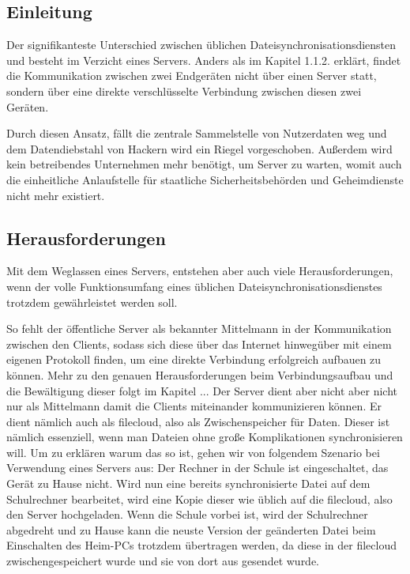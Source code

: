 \subsection{Einleitung}
Der signifikanteste Unterschied zwischen üblichen Dateisynchronisationsdiensten
und \sblit besteht im Verzicht eines Servers. Anders als im Kapitel 1.1.2. erklärt,
findet die Kommunikation zwischen zwei Endgeräten nicht über einen Server statt,
sondern über eine direkte verschlüsselte Verbindung zwischen diesen zwei Geräten.

Durch diesen Ansatz, fällt die zentrale Sammelstelle von Nutzerdaten
weg und dem Datendiebstahl von Hackern wird ein Riegel vorgeschoben. Außerdem
wird kein betreibendes Unternehmen mehr benötigt, um Server zu warten, womit auch
die einheitliche Anlaufstelle für staatliche Sicherheitsbehörden und Geheimdienste
nicht mehr existiert.

\subsection{Herausforderungen}
Mit dem Weglassen eines Servers, entstehen aber auch viele Herausforderungen,
wenn der volle Funktionsumfang eines üblichen Dateisynchronisationsdienstes
trotzdem gewährleistet werden soll.

So fehlt der öffentliche Server als bekannter \glqq{} Mittelmann \grqq{} in der Kommunikation
zwischen den Clients, sodass sich diese über das Internet hinwegüber mit einem
eigenen Protokoll finden, um eine direkte Verbindung erfolgreich aufbauen zu können.
Mehr zu den genauen Herausforderungen beim Verbindungsaufbau und
die Bewältigung dieser folgt im Kapitel ...
Der Server dient aber nicht aber nicht nur als \glqq{} Mittelmann \grqq{} damit die Clients
miteinander kommunizieren können. Er dient nämlich auch als \gls{filecloud},
also als Zwischenspeicher für Daten. Dieser ist nämlich essenziell, wenn man
Dateien ohne große Komplikationen synchronisieren will. Um zu erklären warum das
so ist, gehen wir von folgendem Szenario bei Verwendung eines Servers aus:
Der Rechner in der Schule ist eingeschaltet, das Gerät zu Hause nicht. Wird nun
eine bereits synchronisierte Datei auf dem Schulrechner bearbeitet, wird eine Kopie dieser wie
üblich auf die \gls{filecloud}, also den Server hochgeladen. Wenn die Schule vorbei ist,
wird der Schulrechner abgedreht und zu Hause kann die neuste Version der geänderten Datei beim
Einschalten des Heim-PCs trotzdem übertragen werden, da diese in der \gls{filecloud}
zwischengespeichert wurde und sie von dort aus gesendet wurde.

